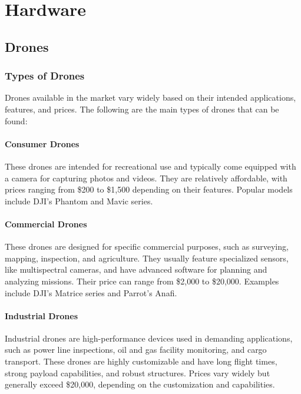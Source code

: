 
\section{Hardware}

\subsection{Drones}
    \subsubsection{Types of Drones}
    Drones available in the market vary widely based on their intended applications, features, and prices. The following are the main types of drones that can be found:
    
    \paragraph{Consumer Drones} These drones are intended for recreational use and typically come equipped with a camera for capturing photos and videos. They are relatively affordable, with prices ranging from \$200 to \$1,500 depending on their features. Popular models include DJI's Phantom and Mavic series.
    
    \paragraph{Commercial Drones} These drones are designed for specific commercial purposes, such as surveying, mapping, inspection, and agriculture. They usually feature specialized sensors, like multispectral cameras, and have advanced software for planning and analyzing missions. Their price can range from \$2,000 to \$20,000. Examples include DJI's Matrice series and Parrot's Anafi.
    
    \paragraph{Industrial Drones} Industrial drones are high-performance devices used in demanding applications, such as power line inspections, oil and gas facility monitoring, and cargo transport. These drones are highly customizable and have long flight times, strong payload capabilities, and robust structures. Prices vary widely but generally exceed \$20,000, depending on the customization and capabilities.
    
